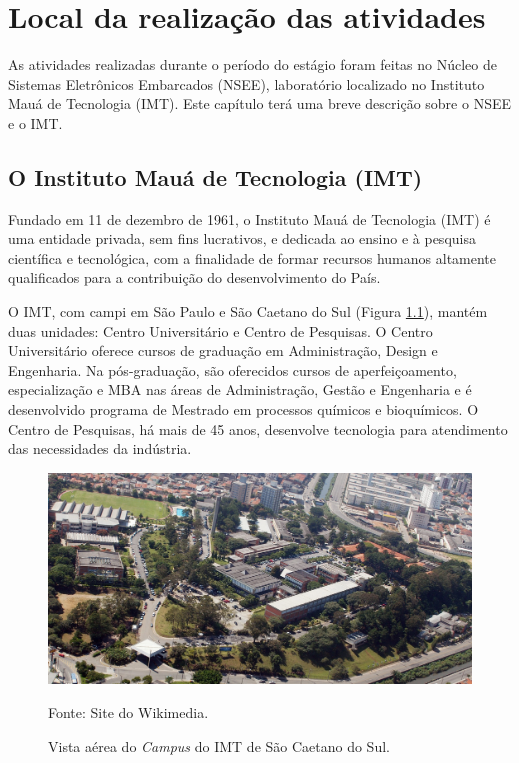 \chapter{Local da realização das atividades}
As atividades realizadas durante o período do estágio foram feitas no Núcleo de Sistemas Eletrônicos Embarcados (NSEE), laboratório localizado no Instituto Mauá de Tecnologia (IMT). Este capítulo terá uma breve descrição sobre o NSEE e o IMT.

\section{O Instituto Mauá de Tecnologia (IMT)}
Fundado em 11 de dezembro de 1961, o Instituto Mauá de Tecnologia (IMT) é uma entidade privada, sem fins lucrativos, e dedicada ao ensino e à pesquisa científica e tecnológica, com a finalidade de formar recursos humanos altamente qualificados para a contribuição do desenvolvimento do País.\cite{InstitutodeEngenharia:Online}

O IMT, com campi em São Paulo e São Caetano do Sul (Figura \ref{IMT}), mantém duas unidades: Centro Universitário e Centro de Pesquisas. O Centro Universitário oferece cursos de graduação em Administração, Design e Engenharia. Na pós-graduação, são oferecidos cursos de aperfeiçoamento, especialização e MBA nas áreas de Administração, Gestão e Engenharia e é desenvolvido programa de Mestrado em processos químicos e bioquímicos. O Centro de Pesquisas, há mais de 45 anos, desenvolve tecnologia para atendimento das necessidades da indústria.\cite{Alunos:Online}


\begin{figure}[!htb]
	\centering
	\caption{Vista aérea do \textit{Campus} do IMT de São Caetano do Sul.}
	\includegraphics[scale = 1]{Imagens/Campus_IMT_foto_aerea.jpg}
	
	Fonte: Site do Wikimedia.\let\thefootnote\relax\footnotemark[1]
		
	\label{IMT}
\end{figure}

